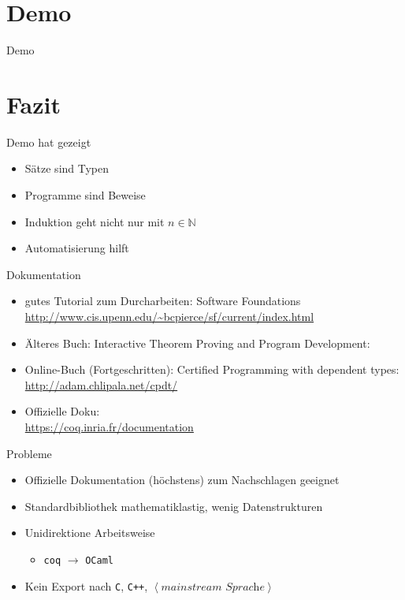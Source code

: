 \documentclass[aspectratio=169]{beamer}
\begin{document}
\section{Demo}
\begin{frame}
  \begin{center}
    \huge{Demo}
  \end{center}
\end{frame}
\section{Fazit}
\begin{frame}
  \begin{center}
    \Large{Demo hat gezeigt}
  \end{center}
  \begin{itemize}
  \item Sätze sind Typen
  \item Programme sind Beweise
  \item Induktion geht nicht nur mit $n\in\mathbb{N}$
  \item Automatisierung hilft
  \end{itemize}
\end{frame}
\begin{frame}
  \begin{center}
    \Large{Dokumentation}
  \end{center}
  \begin{itemize}
  \item gutes Tutorial zum Durcharbeiten: Software Foundations\\
    \qquad \url{http://www.cis.upenn.edu/~bcpierce/sf/current/index.html}
  \item Älteres Buch: Interactive Theorem Proving and Program Development:\\
  \item Online-Buch (Fortgeschritten): Certified Programming with dependent types:\\
    \qquad \url{http://adam.chlipala.net/cpdt/}
  \item Offizielle Doku:\\
    \qquad \url{https://coq.inria.fr/documentation}
  \end{itemize}
\end{frame}
\begin{frame}
  \begin{center}
    \Large{Probleme}
  \end{center}
  \begin{itemize}
  \item Offizielle Dokumentation (höchstens) zum Nachschlagen geeignet
  \item Standardbibliothek mathematiklastig, wenig Datenstrukturen
  \item Unidirektione Arbeitsweise 
    \begin{itemize}
    \item \texttt{coq} $\longrightarrow$ \texttt{OCaml}
    \end{itemize}
  \item Kein Export nach \texttt{C}, \texttt{C++}, $\left<\textit{mainstream Sprache}\right>$
  \end{itemize}
\end{frame} %
\end{document}
